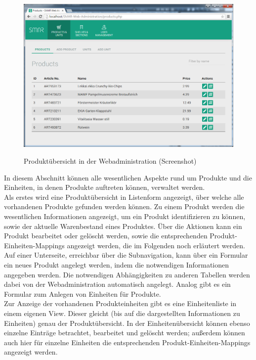\begin{figure}[H]
	\centering
	{\includegraphics[width=\textwidth]{Bilder/Abbildungen/webadmin_products.png}}
	\caption{Produktübersicht in der Webadministration (Screenshot)}
	\label{fig:webadmin_products}
\end{figure}

In diesem Abschnitt können alle wesentlichen Aspekte rund um Produkte und die Einheiten, in denen Produkte auftreten können, verwaltet werden.\\

Als erstes wird eine Produktübersicht in Listenform angezeigt, über welche alle vorhandenen Produkte gefunden werden können. Zu einem Produkt werden die wesentlichen Informationen angezeigt, um ein Produkt identifizieren zu können, sowie der aktuelle Warenbestand eines Produktes. Über die Aktionen kann ein Produkt bearbeitet oder gelöscht werden, sowie die entsprechenden Produkt-Einheiten-Mappings angezeigt werden, die im Folgenden noch erläutert werden.\\

Auf einer Unterseite, erreichbar über die Subnavigation, kann über ein Formular ein neues Produkt angelegt werden, indem die notwendigen Informationen angegeben werden. Die notwendigen Abhängigkeiten zu anderen Tabellen werden dabei von der Webadministration automatisch angelegt. Analog gibt es ein Formular zum Anlegen von Einheiten für Produkte.\\

Zur Anzeige der vorhandenen Produkteinheiten gibt es eine Einheitenliste in einem eigenen View. Dieser gleicht (bis auf die dargestellten Informationen zu Einheiten) genau der Produktübersicht. In der Einheitenübersicht können ebenso einzelne Einträge betrachtet, bearbeitet und gelöscht werden; außerdem können auch hier für einzelne Einheiten die entsprechenden Produkt-Einheiten-Mappings angezeigt werden.\\

